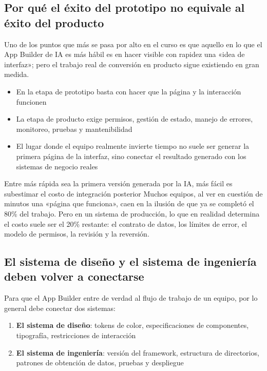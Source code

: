 \documentclass[a4paper]{article}
\begin{document}
\subsection{Por qué el éxito del prototipo no equivale al éxito del producto}

Uno de los puntos que más se pasa por alto en el curso es que aquello en lo que el App Builder de IA es más hábil es en hacer visible con rapidez una «idea de interfaz»; pero el trabajo real de conversión en producto sigue existiendo en gran medida.

\begin{itemize}
    \item En la etapa de prototipo basta con hacer que la página y la interacción funcionen
    \item La etapa de producto exige permisos, gestión de estado, manejo de errores, monitoreo, pruebas y mantenibilidad
    \item El lugar donde el equipo realmente invierte tiempo no suele ser generar la primera página de la interfaz, sino conectar el resultado generado con los sistemas de negocio reales
\end{itemize}

\begin{warningbox}{Entre más rápida sea la primera versión generada por la IA, más fácil es subestimar el costo de integración posterior}
Muchos equipos, al ver en cuestión de minutos una «página que funciona», caen en la ilusión de que ya se completó el 80\% del trabajo. Pero en un sistema de producción, lo que en realidad determina el costo suele ser el 20\% restante: el contrato de datos, los límites de error, el modelo de permisos, la revisión y la reversión.
\end{warningbox}

\subsection{El sistema de diseño y el sistema de ingeniería deben volver a conectarse}

Para que el App Builder entre de verdad al flujo de trabajo de un equipo, por lo general debe conectar dos sistemas:

\begin{enumerate}
    \item \textbf{El sistema de diseño}: tokens de color, especificaciones de componentes, tipografía, restricciones de interacción
    \item \textbf{El sistema de ingeniería}: versión del framework, estructura de directorios, patrones de obtención de datos, pruebas y despliegue
\end{enumerate}
\end{document}
